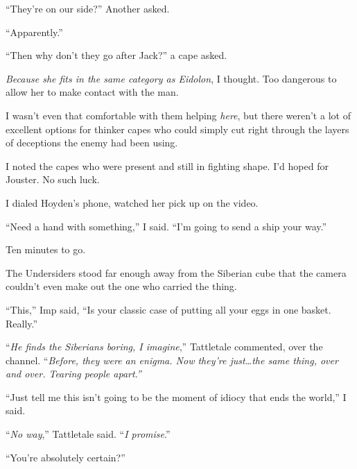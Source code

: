 ``They're on our side?''  Another asked.



``Apparently.''



``Then why don't they go after Jack?'' a cape asked.



\emph{Because she fits in the same category as Eidolon}, I thought.  Too dangerous to allow her to make contact with the man.



I wasn't even that comfortable with them helping \emph{here}, but there weren't a lot of excellent options for thinker capes who could simply cut right through the layers of deceptions the enemy had been using.



I noted the capes who were present and still in fighting shape.  I'd hoped for Jouster.  No such luck.



I dialed Hoyden's phone, watched her pick up on the video.



``Need a hand with something,'' I said.  ``I'm going to send a ship your way.''



\sectionbreak



Ten minutes to go.



The Undersiders stood far enough away from the Siberian cube that the camera couldn't even make out the one who carried the thing.



``This,'' Imp said, ``Is your classic case of putting all your eggs in one basket.  Really.''



``\emph{He finds the Siberians boring, I imagine},'' Tattletale commented, over the channel.  ``\emph{Before, they were an enigma.  Now they're just\ldots the same thing, over and over.  Tearing people apart.''}



``Just tell me this isn't going to be the moment of idiocy that ends the world,'' I said.



``\emph{No way},'' Tattletale said.  ``\emph{I promise}.''



``You're absolutely certain?''



